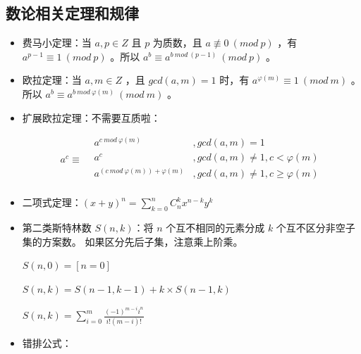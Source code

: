 \documentclass[a4paper,11pt]{article}
\begin{document}
\subsection{数论相关定理和规律}
\begin{itemize}
\item
  费马小定理：当 \(a,p\in Z\) 且 \(p\) 为质数，且
  \(a\not\equiv 0\ (mod\ p)\) ，有 \(a^{p-1}\equiv 1\ (mod\ p)\) 。所以
  \(a^b\equiv a^{b\ mod\ (p-1)}\ (mod\ p)\) 。
\item
  欧拉定理：当 \(a,m\in Z\) ，且 \(gcd(a,m)=1\) 时，有
  \(a^{\varphi(m)}\equiv 1\ (mod\ m)\) 。所以
  \(a^b\equiv a^{b\ mod\ \varphi(m)}\ (mod\ m)\) 。 
\item
  扩展欧拉定理：不需要互质啦：

  \begin{equation}
  a^c \equiv
  \begin{aligned}
  &a^{c\ mod\ \varphi(m)}&,{gcd(a,m)=1}\\
  &a^c&,gcd(a,m)\not=1,c<\varphi(m)\\
  &a^{(c\ mod\ \varphi(m))+\varphi(m)}&,{gcd(a,m)\not=1,c\ge\varphi(m)}\\
  \end{aligned}
  \end{equation}
\item
  二项式定理：\((x+y)^n=\sum\limits_{k=0}^{n}{C_{n}^{k}x^{n-k}y^k}\)
\item
  第二类斯特林数 \(S(n, k)\)：将 \(n\) 个互不相同的元素分成 \(k\) 个互不区分非空子集的方案数。
  如果区分先后子集，注意乘上阶乘。
  
  \(S(n,0) = [n=0]\)
  
  \(S(n,k)=S(n-1,k-1)+k\times S(n-1, k)\)

  \(S(n,k)=\sum\limits_{i=0}^{m}{\frac{(-1)^{m-i}i^n}{i!(m-i)!}}\)
\item
  错排公式：


\end{itemize}
\end{document}
